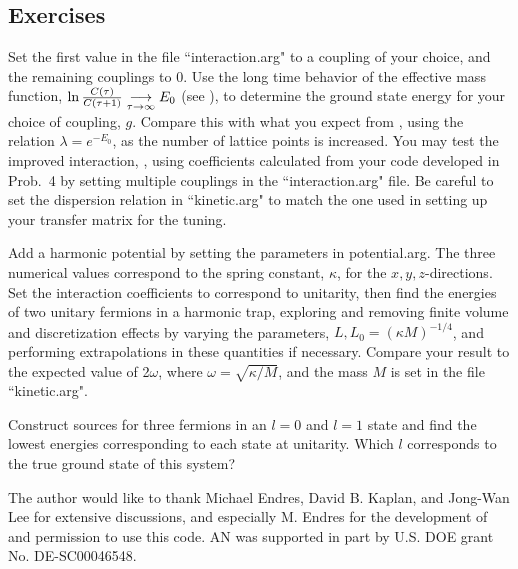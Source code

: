 \subsection{Exercises}
\begin{prob}
Set the first value in the file ``interaction.arg" to a coupling of your choice, and the remaining couplings to $0$. Use the long time behavior of the effective mass function, $\ln \frac{C(\tau)}{C(\tau+1)} \underset{\tau \to\infty}{\longrightarrow} E_0$ (see ), to determine the ground state energy for your choice of coupling, $g$. Compare this with what you expect from , using the relation $\lambda = e^{-E_0}$, as the number of lattice points is increased. You may test the improved interaction, , using coefficients calculated from your code developed in Prob.~4 by setting multiple couplings in the ``interaction.arg" file. Be careful to set the dispersion relation in ``kinetic.arg" to match the one used in setting up your transfer matrix for the tuning.
\end{prob}

\begin{prob}
 Add a harmonic potential by setting the parameters in potential.arg. The three numerical values correspond to the spring constant, $\kappa$, for the $x,y,z$-directions. Set the interaction coefficients to correspond to unitarity, then find the energies of two unitary fermions in a harmonic trap, exploring and removing finite volume and discretization effects by varying the parameters, $L,L_0=\left(\kappa M\right)^{-1/4}$, and performing extrapolations in these quantities if necessary. Compare your result to the expected value of 2$\omega$, where $\omega = \sqrt{\kappa/M}$, and the mass $M$ is set in the file ``kinetic.arg". 
\end{prob}

\begin{prob}
Construct sources for three fermions in an $l=0$ and $l=1$ state and find the lowest energies corresponding to each state at unitarity. Which $l$ corresponds to the true ground state of this system?
\end{prob}

\begin{acknowledgement}
The author would like to thank Michael Endres, David B. Kaplan, and Jong-Wan Lee for extensive discussions, and especially M. Endres for the development of and permission to use this code. AN was supported in part by U.S. DOE grant No. DE-SC00046548. 
\end{acknowledgement}








